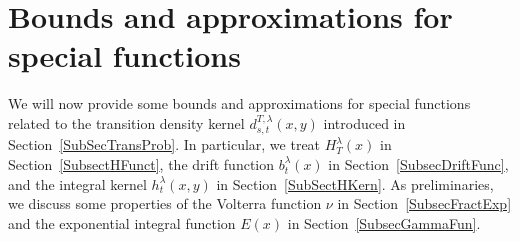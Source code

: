 \documentclass[10pt]{article}
\numberwithin{equation}{section}
\theoremstyle{definition}
\begin{document}
\section{Bounds and approximations for special functions}\label{SectionBasics}
We will now provide some bounds and approximations for special  functions related to the transition density kernel $d^{T,\lambda}_{s,t}(x,y)$ introduced in Section~\ref{SubSecTransProb}.  In particular, we treat  $H_T^{\lambda}(x)$ in Section~\ref{SubsectHFunct}, the drift function $b_t^{\lambda}(x)$ in Section~\ref{SubsecDriftFunc}, and the integral kernel  $h_t^{\lambda}(x,y)$  in Section~\ref{SubSectHKern}.  As preliminaries, we discuss some properties of the Volterra  function $\nu$ in  Section~\ref{SubsecFractExp} and the exponential integral function $E(x)$ in Section~\ref{SubsecGammaFun}.
\end{document}
